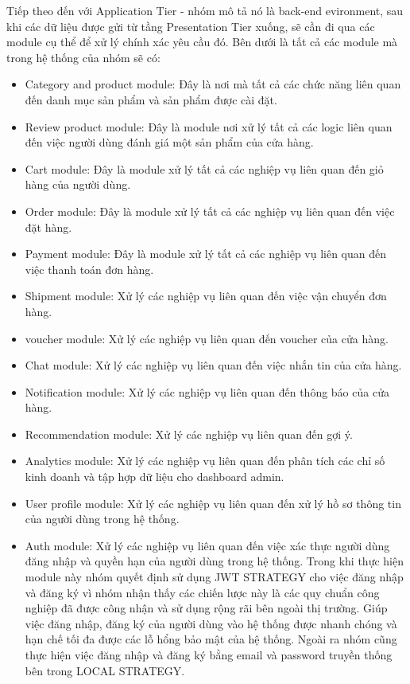 Tiếp theo đến với Application Tier - nhóm mô tả nó là back-end evironment, sau khi các dữ liệu được gửi từ tầng Presentation Tier xuống, sẽ cần đi qua các module cụ thể để xử lý chính xác yêu cầu đó. Bên dưới là tất cả các module mà trong hệ thống của nhóm sẽ có: \\
\begin{itemize}
	\item Category and product module: Đây là nơi mà tất cả các chức năng liên quan đến danh mục sản phẩm và sản phẩm được cài đặt.
	\item Review product module: Đây là module nơi xử lý tất cả các logic liên quan đến việc người dùng đánh giá một sản phẩm của cửa hàng.
	\item Cart module: Đây là module xử lý tất cả các nghiệp vụ liên quan đến giỏ hàng của người dùng.
	\item  Order module: Đây là module xử lý tất cả các nghiệp vụ liên quan đến việc đặt hàng.
	\item Payment module: Đây là module xử lý tất cả các nghiệp vụ liên quan đến việc thanh toán đơn hàng.
	\item Shipment module: Xử lý các nghiệp vụ liên quan đến việc vận chuyển đơn hàng.
	\item voucher module: Xử lý các nghiệp vụ liên quan đến voucher của cửa hàng.
	\item Chat module: Xử lý các nghiệp vụ liên quan đến việc nhắn tin của cửa hàng.
	\item Notification module: Xử lý các nghiệp vụ liên quan đến thông báo của cửa hàng.
	\item Recommendation module: Xử lý các nghiệp vụ liên quan đến gợi ý.
	\item Analytics module: Xử lý các nghiệp vụ liên quan đến phân tích các chỉ số kinh doanh và tập hợp dữ liệu cho dashboard admin.
	\item User profile module: Xử lý các nghiệp vụ liên quan đến xử lý hồ sơ thông tin của người dùng trong hệ thống.
	\item Auth module: Xử lý các nghiệp vụ liên quan đến việc xác thực người dùng đăng nhập và quyền hạn của người dùng trong hệ thống. Trong khi thực hiện module này nhóm quyết định sử dụng JWT STRATEGY cho việc đăng nhập và đăng ký vì nhóm nhận thấy các chiến lược này là các quy chuẩn công nghiệp đã được công nhận và sử dụng rộng rãi bên ngoài thị trường. Giúp việc đăng nhập, đăng ký của người dùng vào hệ thống được nhanh chóng và hạn chế tối đa được các lỗ hổng bảo mật của hệ thống. Ngoài ra nhóm cũng thực hiện việc đăng nhập và đăng ký bằng email và password truyền thống bên trong LOCAL STRATEGY.

\end{itemize}
